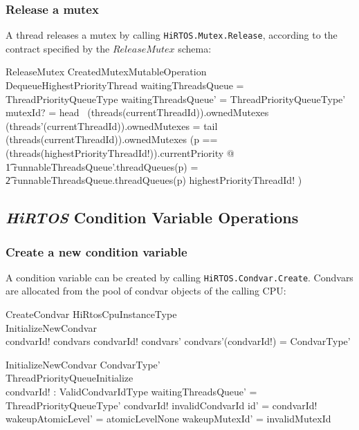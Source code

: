 \documentclass[11pt,letterpaper,twoside,openany]{book}
\begin{document}
\subsubsection{Release a mutex}

A thread releases a mutex by calling \verb`HiRTOS.Mutex.Release`, according to the contract
specified by the $ReleaseMutex$ schema:

\begin{schema}{ReleaseMutex}
   CreatedMutexMutableOperation \\
   DequeueHighestPriorityThread
\where
   waitingThreadsQueue = \theta ThreadPriorityQueueType
\also
   waitingThreadsQueue' = \theta ThreadPriorityQueueType'
\also
   mutexId? = head~ (threads(currentThreadId)).ownedMutexes
\also
   (threads'(currentThreadId)).ownedMutexes = tail~ (threads(currentThreadId)).ownedMutexes
\also
   (\LET p == (threads(highestPriorityThreadId!)).currentPriority @ \\
   \t1 runnableThreadsQueue'.threadQueues(p) = \\
   \t2 runnableThreadsQueue.threadQueues(p) \cat \langle highestPriorityThreadId! \rangle)
\end{schema}

\subsection{\emph{HiRTOS} Condition Variable Operations}

\subsubsection{Create a new condition variable}

A condition variable can be created by calling \verb`HiRTOS.Condvar.Create`. Condvars are allocated
from the pool of condvar objects of the calling CPU:

\begin{schema}{CreateCondvar}
   \Delta HiRtosCpuInstanceType \\
   InitializeNewCondvar \\
\where
   condvarId! \notin \dom condvars
\also
   condvarId! \in \dom condvars'
\also
   condvars'(condvarId!) = \theta CondvarType'
\end{schema}

\begin{schema}{InitializeNewCondvar}
   CondvarType' \\
   ThreadPriorityQueueInitialize \\
   condvarId! : ValidCondvarIdType
\where
   waitingThreadsQueue' = \theta ThreadPriorityQueueType'
\also
   condvarId! \neq invalidCondvarId
\also
   id' = condvarId!
\also
   wakeupAtomicLevel' = atomicLevelNone
\also
   wakeupMutexId' = invalidMutexId
\end{schema}
\end{document}
